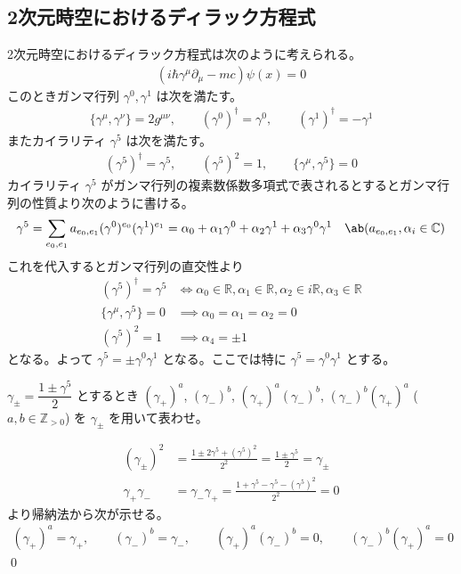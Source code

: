 \documentclass[uplatex,dvipdfmx,a4paper,11pt]{jlreq}
\makeatletter
\newcommand{\CC}{\mathbb{C}}
\newcommand{\RR}{\mathbb{R}}
\newcommand{\ZZ}{\mathbb{Z}}
\numberwithin{equation}{section}
\theoremstyle{definition}
\renewenvironment{proof}[1][\proofname]{\par
  \normalfont
  \topsep6\p@\@plus6\p@ \trivlist
  \item[\hskip\labelsep{\bfseries #1}\@addpunct{\bfseries}]\ignorespaces\quad\par
}{%
  \qed\endtrivlist\@endpefalse
}
\renewcommand\proofname{証明}
\makeatother
\begin{document}
\subsection{2次元時空におけるディラック方程式}
2次元時空におけるディラック方程式は次のように考えられる。
\begin{align}
  (i\hbar\gamma^\mu\partial_\mu - mc)\psi(x) = 0
\end{align}
このときガンマ行列 $\gamma^0, \gamma^1$ は次を満たす。
\begin{align}
  \lbrace\gamma^\mu, \gamma^\nu\rbrace = 2g^{\mu\nu}, \qquad (\gamma^0)^\dagger = \gamma^0, \qquad (\gamma^1)^\dagger = - \gamma^1
\end{align}
またカイラリティ $\gamma^5$ は次を満たす。
\begin{align}
  (\gamma^5)^\dagger = \gamma^5, \qquad (\gamma^5)^2 = 1, \qquad \lbrace\gamma^\mu, \gamma^5\rbrace = 0
\end{align}
カイラリティ $\gamma^5$ がガンマ行列の複素数係数多項式で表されるとするとガンマ行列の性質より次のように書ける。
\begin{align}
  \gamma^5 & = \sum_{e_0, e_1}a_{e_0,e_1}(\gamma^0)^{e_0}(\gamma^1)^{e_1} = \alpha_0 + \alpha_1\gamma^0 + \alpha_2\gamma^1 + \alpha_3\gamma^0\gamma^1 & \ab(a_{e_0, e_1}, \alpha_i\in\CC)
\end{align}
これを代入するとガンマ行列の直交性より
\begin{align}
  (\gamma^5)^\dagger = \gamma^5          & \iff \alpha_0\in\RR, \alpha_1\in\RR, \alpha_2\in i\RR, \alpha_3\in\RR \\
  \lbrace\gamma^\mu, \gamma^5\rbrace = 0 & \implies \alpha_0 = \alpha_1 = \alpha_2 = 0                           \\
  (\gamma^5)^2 = 1                       & \implies \alpha_4 = \pm 1
\end{align}
となる。よって $\gamma^5 = \pm \gamma^0\gamma^1$ となる。ここでは特に $\gamma^5 = \gamma^0\gamma^1$ とする。

\begin{problem}
$\gamma_\pm = \dfrac{1 \pm \gamma^5}{2}$ とするとき $(\gamma_+)^a$, $(\gamma_-)^b$, $(\gamma_+)^a(\gamma_-)^b$, $(\gamma_-)^b(\gamma_+)^a$ ($a, b\in\ZZ_{>0}$) を $\gamma_\pm$ を用いて表わせ。
\end{problem}
\begin{proof}
  \begin{align}
    (\gamma_\pm)^2   & = \frac{1 \pm 2\gamma^5 + (\gamma^5)^2}{2^2} = \frac{1 \pm \gamma^5}{2} = \gamma_\pm \\
    \gamma_+\gamma_- & = \gamma_-\gamma_+ = \frac{1 + \gamma^5 - \gamma^5 - (\gamma^5)^2}{2^2} = 0
  \end{align}
  より帰納法から次が示せる。
  \begin{align}
    (\gamma_+)^a = \gamma_+, \qquad (\gamma_-)^b = \gamma_-, \qquad (\gamma_+)^a(\gamma_-)^b = 0, \qquad (\gamma_-)^b(\gamma_+)^a = 0
  \end{align}
\end{proof}
\end{document}
